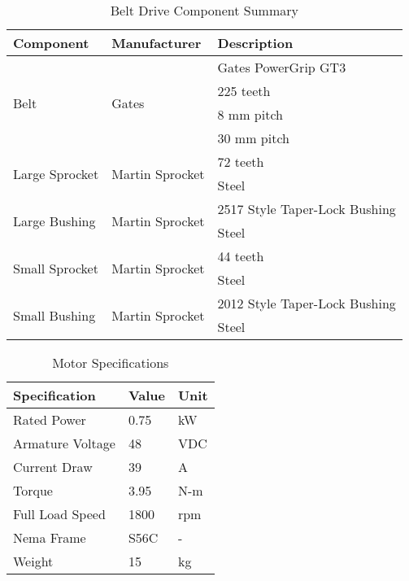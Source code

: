  \begin{table}[htbp]
 	\centering
 	\caption{Belt Drive Component Summary}
 	\begin{tabular}{| lll |} \hline
 		Component & Manufacturer & Description \\ \hline
 		\multirow{4}{*}{Belt} & \multirow{4}{*}{Gates} & Gates PowerGrip GT3 \\
		& & 225 teeth \\
		& & 8 mm pitch \\
		& & 30 mm pitch \\ \hline
		\multirow{2}{*}{Large Sprocket} & \multirow{2}{*}{Martin Sprocket} & 72 teeth\\
		& & Steel \\ \hline
		\multirow{2}{*}{Large Bushing} & \multirow{2}{*}{Martin Sprocket} & 2517 Style Taper-Lock Bushing\\
		& & Steel \\ \hline
		\multirow{2}{*}{Small Sprocket} & \multirow{2}{*}{Martin Sprocket} & 44 teeth\\
		& & Steel \\ \hline
		\multirow{2}{*}{Small Bushing} & \multirow{2}{*}{Martin Sprocket} & 2012 Style Taper-Lock Bushing\\
		& & Steel \\ \hline
	\end{tabular}
 	\label{tab:drive_comp}
 \end{table}


  \begin{table}[htbp]
 \centering
 \caption{Motor Specifications}
 \begin{tabular}{| lll |} \hline
 Specification & Value & Unit \\ \hline
Rated Power & 0.75 & kW \\
Armature Voltage & 48 & VDC \\
Current Draw & 39 & A \\
Torque & 3.95 & N-m \\
Full Load Speed & 1800 & rpm \\
Nema Frame & S56C & - \\
Weight & 15 & kg \\ \hline
 \end{tabular}
 \label{tab:motor_spec}
 \end{table}
 
 